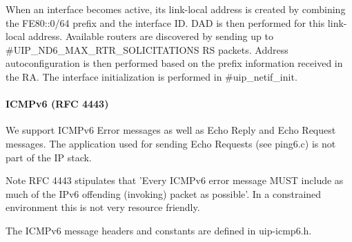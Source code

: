 \-When an interface becomes active, its link-\/local address is created by combining the \-F\-E80\-:\-:0/64 prefix and the interface \-I\-D. \-D\-A\-D is then performed for this link-\/local address. \-Available routers are discovered by sending up to \#\-U\-I\-P\-\_\-\-N\-D6\-\_\-\-M\-A\-X\-\_\-\-R\-T\-R\-\_\-\-S\-O\-L\-I\-C\-I\-T\-A\-T\-I\-O\-N\-S \-R\-S packets. \-Address autoconfiguration is then performed based on the prefix information received in the \-R\-A. \-The interface initialization is performed in \#uip\-\_\-netif\-\_\-init.\hypertarget{a00061_icmpv6}{}\paragraph{\-I\-C\-M\-Pv6 (\-R\-F\-C 4443)}\label{a00061_icmpv6}
\-We support \-I\-C\-M\-Pv6 \-Error messages as well as \-Echo \-Reply and \-Echo \-Request messages. \-The application used for sending \-Echo \-Requests (see ping6.\-c) is not part of the \-I\-P stack.

\begin{DoxyNote}{\-Note}
\-R\-F\-C 4443 stipulates that '\-Every \-I\-C\-M\-Pv6 error message \-M\-U\-S\-T include as much of the \-I\-Pv6 offending (invoking) packet as possible'. \-In a constrained environment this is not very resource friendly.
\end{DoxyNote}
\-The \-I\-C\-M\-Pv6 message headers and constants are defined in uip-\/icmp6.\-h.




